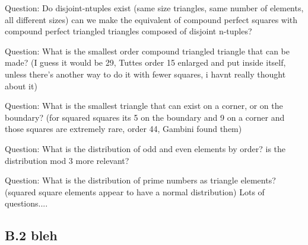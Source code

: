 \documentclass[12pt,amstags,fleqn]{article}
\theoremstyle{plain}
\theoremstyle{definition}
\begin{document}
\clearpage


Question: Do disjoint-ntuples exist (same size triangles, same number of
elements, all different sizes) can we make the equivalent of compound
perfect squares with compound perfect triangled triangles composed
of disjoint n-tuples?

Question: What is the smallest order compound triangled triangle that can
be made? (I guess it would be 29, Tuttes order 15 enlarged and put
inside itself, unless there's another way to do it with fewer squares,
i havnt really thought about it)

Question: What is the smallest triangle that can exist on a corner, or
on the boundary? (for squared squares its 5 on the boundary and 9
on a corner and those squares are extremely rare, order 44, Gambini
found them)


Question: What is the distribution of odd and even elements by order?
is the distribution mod 3 more relevant?

Question: What is the distribution of prime numbers as triangle elements?
(squared square elements appear to have a normal distribution) Lots
of questions....




\subsection*{B.2 bleh}


\clearpage

%
%
\end{document}
